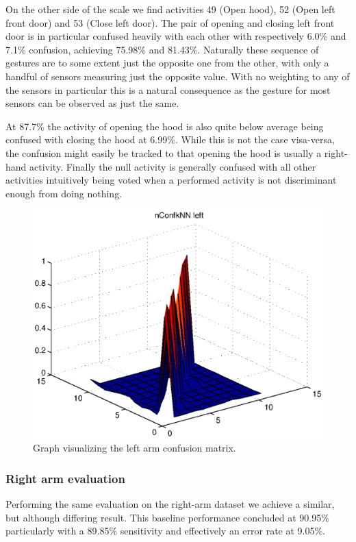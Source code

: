\documentclass{sig-alternate}
\begin{document}
On the other side of the scale we find activities 49 (Open hood), 52 (Open left front door) and 53 (Close left door). The pair of opening and closing left front door is in particular confused heavily with each other with respectively 6.0\% and 7.1\% confusion, achieving 75.98\% and 81.43\%. Naturally these sequence of gestures are to some extent just the opposite one from the other, with only a handful of sensors measuring just the opposite value. With no weighting to any of the sensors in particular this is a natural consequence as the gesture for most sensors can be observed as just the same.

At 87.7\% the activity of opening the hood is also quite below average being confused with closing the hood at 6.99\%. While this is not the case visa-versa, the confusion might easily be tracked to that opening the hood is usually a right-hand activity. Finally the null activity is generally confused with all other activities intuitively being voted when a performed activity is not discriminant enough from doing nothing.

\begin{figure}[bp]
  \centering
  \includegraphics[scale=0.4]{./matlab_output/nConfkNN_left.eps}
  \caption{Graph visualizing the left arm confusion matrix.}
  \label{fig:conf_left_surf}
\end{figure}

\subsubsection{Right arm evaluation}
Performing the same evaluation on the right-arm dataset we achieve a similar, but although differing result. This baseline performance concluded at 90.95\% particularly with a 89.85\% sensitivity and effectively an error rate at 9.05\%.
\end{document}
